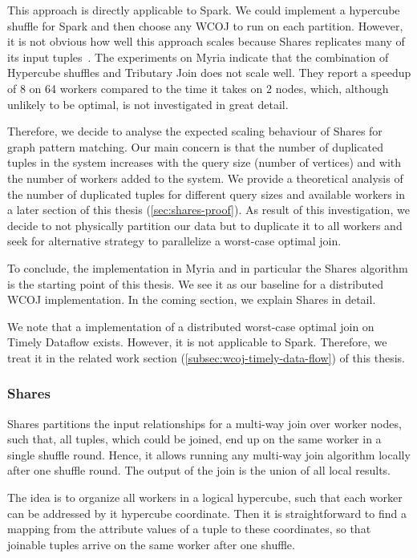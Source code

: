 This approach is directly applicable to Spark.
We could implement a hypercube shuffle for Spark and then choose any \textsc{WCOJ} to run on each partition.
However, it is not obvious how well this approach scales because Shares replicates many of its input tuples~\cite{myria-detailed}.
The experiments on Myria indicate that the combination of Hypercube shuffles and Tributary Join does not scale well.
They report a speedup of 8 on 64 workers compared to the time it takes on 2 nodes, which, although unlikely to be optimal, is not
investigated in great detail.

Therefore, we decide to analyse the expected scaling behaviour of Shares for graph pattern matching.
Our main concern is that the number of duplicated tuples in the system increases with the query size (number of vertices) and
with the number of workers added to the system.
We provide a theoretical analysis of the number of duplicated tuples for different query sizes and available workers in a later section
of this thesis (\ref{sec:shares-proof}). %
As result of this investigation, we decide to not physically partition our data but to duplicate it to all workers and seek for alternative
strategy to parallelize a worst-case optimal join.

To conclude, the implementation in Myria and in particular the Shares algorithm is the starting point of this thesis.
We see it as our baseline for a distributed \textsc{WCOJ} implementation.
In the coming section, we explain Shares in detail.

We note that a implementation of a distributed worst-case optimal join on Timely Dataflow exists.
However, it is not applicable to Spark.
Therefore, we treat it in the related work section (\ref{subsec:wcoj-timely-data-flow}) of this thesis.

\subsubsection{Shares}
Shares partitions the input relationships for a multi-way join over worker nodes, such that, all tuples, which could be joined,
end up on the same worker in a single shuffle round.
Hence, it allows running any multi-way join algorithm locally after one shuffle round.
The output of the join is the union of all local results.

The idea is to organize all workers in a logical hypercube, such that each worker can be addressed by it hypercube coordinate.
Then it is straightforward to find a mapping from the attribute values of a tuple to these coordinates, so that joinable tuples
arrive on the same worker after one shuffle.

